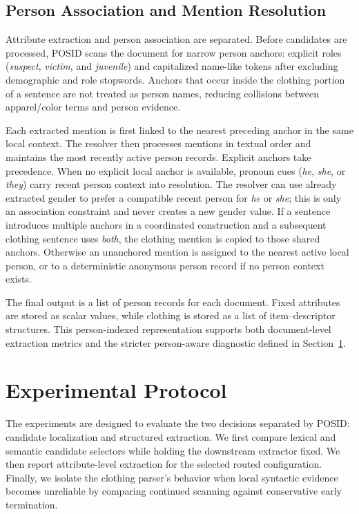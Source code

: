 \documentclass[sigconf,nonacm]{acmart}
\newcommand{\posid}{\textsc{POSID}}
\begin{document}
\subsection{Person Association and Mention Resolution}
\label{subsec:person-resolution}

Attribute extraction and person association are separated.  Before candidates
are processed, \posid{} scans the document for narrow person anchors: explicit
roles (\emph{suspect}, \emph{victim}, and \emph{juvenile}) and capitalized
name-like tokens after excluding demographic and role stopwords.  Anchors that
occur inside the clothing portion of a sentence are not treated as person
names, reducing collisions between apparel/color terms and person evidence.

Each extracted mention is first linked to the nearest preceding
anchor in the same local context.  The resolver then processes mentions in
textual order and maintains the most recently active person records.  Explicit
anchors take precedence.  When no explicit local anchor is available, pronoun cues
(\emph{he}, \emph{she}, or \emph{they}) carry recent person context into
resolution.  The resolver can use already extracted gender to prefer a
compatible recent person for \emph{he} or \emph{she}; this is only an
association constraint and never creates a new gender value.  If a sentence
introduces multiple anchors in a coordinated construction and a subsequent
clothing sentence uses \emph{both}, the clothing mention is copied to those
shared anchors.  Otherwise an unanchored mention is assigned to the nearest
active local person, or to a deterministic anonymous person record if no person
context exists.

The final output is a list of person records for each document.  Fixed
attributes are stored as scalar values, while clothing is stored as a list of
item--descriptor structures.  This person-indexed representation supports both
document-level extraction metrics and the stricter person-aware diagnostic
defined in Section~\ref{sec:experiments}.


\section{Experimental Protocol}
\label{sec:experiments}

The experiments are designed to evaluate the two decisions separated by
\posid{}: candidate localization and structured extraction.  We first compare
lexical and semantic candidate selectors while holding the downstream
extractor fixed.  We then report attribute-level extraction for the selected
routed configuration.  Finally, we isolate the clothing parser's behavior when
local syntactic evidence becomes unreliable by comparing continued scanning
against conservative early termination.
\end{document}
